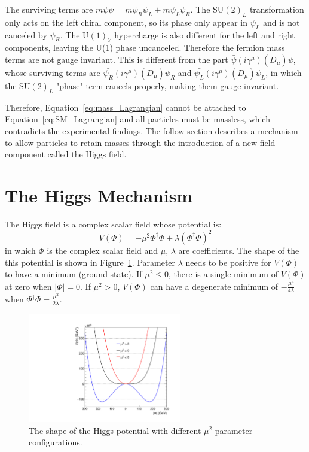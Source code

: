 The surviving terms are $m\bar{\psi} \psi = m\bar{\psi_{R}}\psi_{L} + m\bar{\psi_{L}}\psi_{R}$.
The SU$(2)_{L}$ transformation only acts on the left chiral component,
so its phase only appear in $\psi_{L}$ and is not canceled by $\psi_{R}$.
The U$(1)_{Y}$ hypercharge is also different for the left and right components,
leaving the U(1) phase uncanceled.
Therefore the fermion mass terms are not gauge invariant.
This is different from the part $\bar{\psi} (i\gamma^{\mu})(D_{\mu})\psi$,
whose surviving terms are $\bar{\psi_{R}} (i\gamma^{\mu})(D_{\mu})\psi_{R}$ and $\bar{\psi_{L}} (i\gamma^{\mu})(D_{\mu})\psi_{L}$, 
in which the SU$(2)_{L}$ "phase" term cancels properly, making them gauge invariant.

Therefore, Equation~\ref{eq:mass_Lagrangian} cannot be attached to Equation~\ref{eq:SM_Lagrangian} and all particles must be massless,
which contradicts the experimental findings.
The follow section describes a mechanism to allow particles to retain masses 
through the introduction of a new field component called the Higgs field.


\section{The Higgs Mechanism}\label{sec:Higgs_mech}

The Higgs field is a complex scalar field whose potential is:
\begin{equation} \label{eq:Higgs_potential}
    V(\Phi) = - \mu^{2} \Phi^{\dagger}\Phi + \lambda(\Phi^{\dagger}\Phi)^{2}
\end{equation}
in which $\Phi$ is the complex scalar field and $\mu$, $\lambda$ are coefficients.
The shape of the this potential is shown in Figure~\ref{fig:Higgs_potential}. 
Parameter $\lambda$ needs to be positive for $V(\Phi)$ to have a minimum (ground state).
If $\mu^{2} \leqslant 0$, there is a single minimum of $V(\Phi)$ at zero when $|\Phi| = 0$.
If $\mu^{2} > 0$, $V(\Phi)$ can have a degenerate minimum of $-\frac{\mu^{4}}{4\lambda}$ when $\Phi^{\dagger}\Phi = \frac{\mu^{2}}{2\lambda}$.

\begin{figure}[!htb]
  \centering
  \includegraphics[width=0.6\textwidth]{pics/Intro/Higgs_field.pdf}
  \caption{The shape of the Higgs potential with different $\mu^{2}$ parameter configurations.}
  \label{fig:Higgs_potential}
\end{figure}

